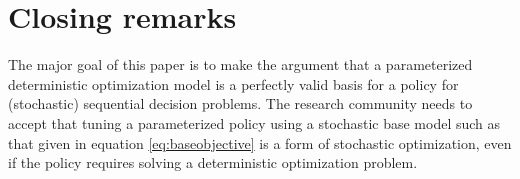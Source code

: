 \documentclass[11pt,oneside,fleqn,reqno,titlepage]{article}
\begin{document}
\begin{comment}
\begin{figure}[tb]
\begin{center}
\texttt{[image: optimizedthetas]}
\end{tabular}
\caption{Optimized values of $\theta_\tau$ for $tau$ time periods into the future.}
\label{fig:optimizedthetas}
\end{center}
\end{figure}





\begin{figure}[tb]
\center{
    \begin{tabular}{cc}
    \texttt{[image: cfaoptimumthetadeterministic]} &
    \texttt{[image: cfaoptimumthetastochastic]} \\
                    (a)                  &                    (b)
    \end{tabular}
    \caption{Objective vs. $\theta_\tau$ for (a) perfect forecasts and (b) stochastic forecasts.}
    \label{fig:cfaoptimumtheta}
    }
\end{figure}
\end{comment}


\section{Closing remarks}
\label{sec:closingremarks}
The major goal of this paper is to make the argument that a parameterized deterministic optimization model is a perfectly valid basis for a policy for (stochastic) sequential decision problems.  The research community needs to accept that tuning a parameterized policy using a stochastic base model such as that given in equation \eqref{eq:baseobjective} is a form of stochastic optimization, even if the policy requires solving a deterministic optimization problem.
\end{document}
